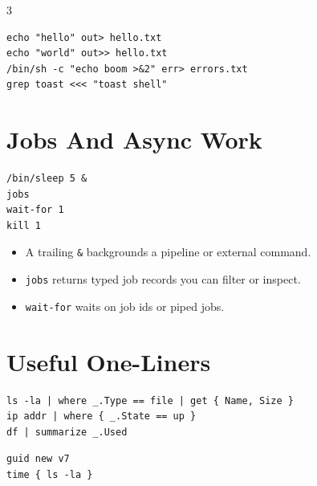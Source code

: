 \begin{multicols*}{3}
\begin{lstlisting}
echo "hello" out> hello.txt
echo "world" out>> hello.txt
/bin/sh -c "echo boom >&2" err> errors.txt
grep toast <<< "toast shell"
\end{lstlisting}


\section{Jobs And Async Work}
\begin{lstlisting}
/bin/sleep 5 &
jobs
wait-for 1
kill 1
\end{lstlisting}

\begin{itemize}
\item A trailing \texttt{\&} backgrounds a pipeline or external command.
\item \texttt{jobs} returns typed job records you can filter or inspect.
\item \texttt{wait-for} waits on job ids or piped jobs.
\end{itemize}


\section{Useful One-Liners}
\begin{lstlisting}
ls -la | where _.Type == file | get { Name, Size }
ip addr | where { _.State == up }
df | summarize _.Used
\end{lstlisting}

\begin{lstlisting}
guid new v7
time { ls -la }
\end{lstlisting}

\end{multicols*}
\newpage



